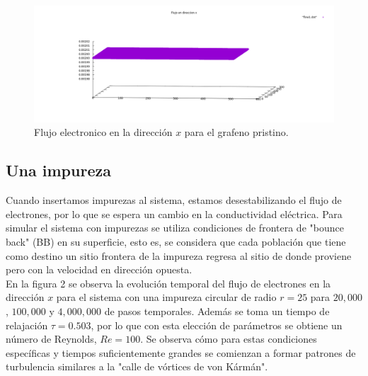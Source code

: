 \documentclass{article}
\begin{document}
\begin{figure}[th!]
   \includegraphics[width=1.16\columnwidth]{pristino.png}
   \caption{Flujo electronico en la dirección $x$ para el grafeno pristino.}
\end{figure}
 
 
 \subsection{Una impureza}
 Cuando insertamos impurezas al sistema, estamos desestabilizando el flujo de electrones, por lo que se espera un cambio en la conductividad eléctrica. Para simular el sistema con impurezas se utiliza condiciones de frontera de "bounce back" (BB) en su superficie, esto es, se considera que cada población que tiene como destino un sitio frontera de la impureza regresa al sitio de donde proviene pero con la velocidad en dirección opuesta.\\
 
 En la figura 2 se observa la evolución temporal del flujo de electrones en la dirección $x$ para el sistema con una impureza circular de radio $r=25$ para $20,000$, $100,000$ y $4,000,000$ de pasos temporales. Además se toma un tiempo de relajación $\tau=0.503$, por lo que con esta elección de parámetros se obtiene un número de Reynolds, $Re=100$. Se observa cómo para estas condiciones específicas y tiempos suficientemente grandes se comienzan a formar patrones de turbulencia similares a la "calle de vórtices de von Kármán".\\
 
\end{document}
